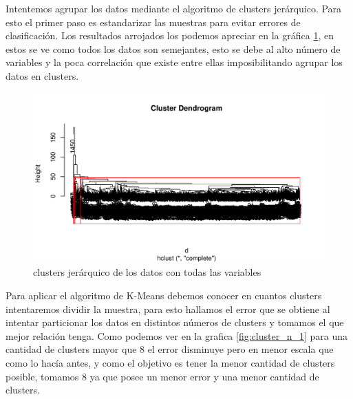 \documentclass[a4paper,10pt,twocolumn]{article}
\begin{document}
	Intentemos agrupar los datos mediante el algoritmo de clusters jerárquico. Para esto el primer paso es estandarizar las muestras para evitar errores de clasificación. Los resultados arrojados los podemos apreciar en la gráfica \ref{fig:dendograma_1}, en estos se ve como todos los datos son semejantes, esto se debe al alto número de variables y la poca correlación que existe entre ellas imposibilitando agrupar los datos en clusters.

	\begin{figure}[htb]
		\begin{center}
			\includegraphics[width=\columnwidth]{figures/dendograma_1.pdf}
		\end{center}
		\caption{clusters jerárquico de los datos con todas las variables \label{fig:dendograma_1}}%
	\end{figure}

	Para aplicar el algoritmo de K-Means debemos conocer en cuantos clusters intentaremos dividir la muestra, para esto hallamos el error que se obtiene al intentar particionar los datos en distintos números de clusters y tomamos el que mejor relación tenga. Como podemos ver en la grafica \ref{fig:cluster_n_1} para una cantidad de clusters mayor que 8 el error disminuye pero en menor escala que como lo hacía antes, y como el objetivo es tener la menor cantidad de clusters posible, tomamos 8 ya que posee un menor error y una menor cantidad de clusters.
\end{document}
